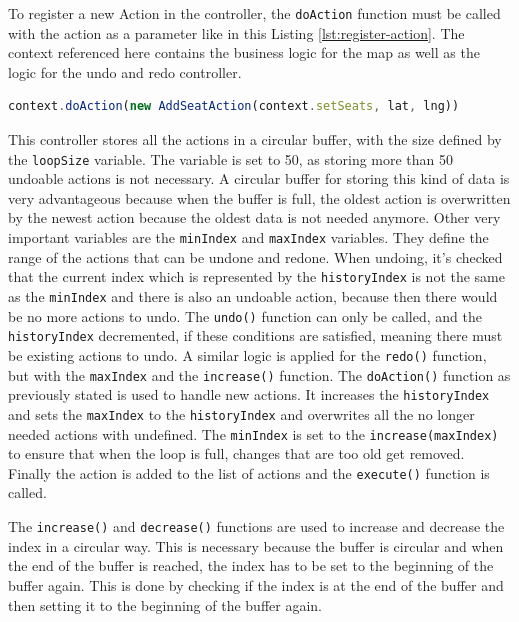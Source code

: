 To register a new Action in the controller, the \texttt{doAction} function must be called with the action as a parameter like in this Listing \ref{lst:register-action}. The context referenced here contains the business logic for the map as well as the logic for the undo and redo controller.

\begin{lstlisting}[language=TypeScript,caption={Registering a New Action in the Controller},label={lst:register-action}]
context.doAction(new AddSeatAction(context.setSeats, lat, lng))
\end{lstlisting}

This controller stores all the actions in a circular buffer, with the size defined by the \texttt{loopSize} variable. The variable is set to 50, as storing more than 50 undoable actions is not necessary. A circular buffer for storing this kind of data is very advantageous because when the buffer is full, the oldest action is overwritten by the newest action because the oldest data is not needed anymore. Other very important variables are the \texttt{minIndex} and \texttt{maxIndex} variables. They define the range of the actions that can be undone and redone. When undoing, it's checked that the current index which is represented by the \texttt{historyIndex} is not the same as the \texttt{minIndex} and there is also an undoable action, because then there would be no more actions to undo. The \texttt{undo()} function can only be called, and the \texttt{historyIndex} decremented, if these conditions are satisfied, meaning there must be existing actions to undo. A similar logic is applied for the \texttt{redo()} function, but with the \texttt{maxIndex} and the \texttt{increase()} function. The \texttt{doAction()} function as previously stated is used to handle new actions. It increases the \texttt{historyIndex} and sets the \texttt{maxIndex} to the \texttt{historyIndex} and overwrites all the no longer needed actions with undefined. The \texttt{minIndex} is set to the \texttt{increase(maxIndex)} to ensure that when the loop is full, changes that are too old get removed. Finally the action is added to the list of actions and the \texttt{execute()} function is called.

The \texttt{increase()} and \texttt{decrease()} functions are used to increase and decrease the index in a circular way. This is necessary because the buffer is circular and when the end of the buffer is reached, the index has to be set to the beginning of the buffer again. This is done by checking if the index is at the end of the buffer and then setting it to the beginning of the buffer again.

